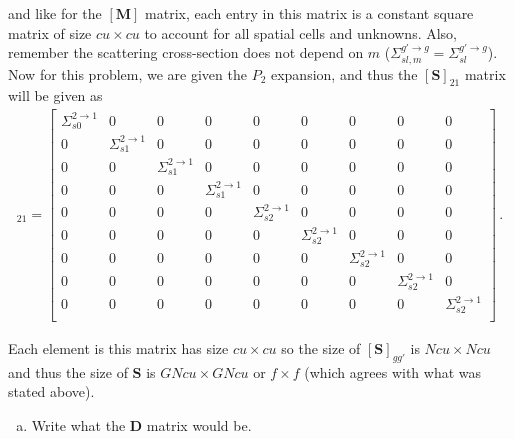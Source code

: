 \documentclass[10pt]{article}
\begin{document}
and like for the $[\textbf{M}]$ matrix, each entry in this matrix is a constant square matrix of size $cu \times cu$ to account for all spatial cells and unknowns. Also, remember the scattering cross-section does not depend on $m$ ($\Sigma_{sl,m}^{g' \rightarrow g} = \Sigma_{sl}^{g' \rightarrow g}$). Now for this problem, we are given the $P_2$ expansion, and thus the $[\textbf{S}]_{21}$ matrix will be given as
%
\begin{align*}
[\textbf{S}]_{21} = 
\begin{bmatrix}
	\Sigma_{s0}^{2\rightarrow 1}  & 0 & 0 & 0 & 0 & 0 & 0 & 0 & 0 \\
	0 & \Sigma_{s1}^{2 \rightarrow 1} & 0 & 0 & 0 & 0 & 0 & 0 & 0 \\
	0 & 0 & \Sigma_{s1}^{2 \rightarrow 1} & 0 & 0 & 0 & 0 & 0 & 0 \\
	0 & 0 & 0 & \Sigma_{s1}^{2 \rightarrow 1} & 0 & 0 & 0 & 0 & 0 \\
	0 & 0 & 0 & 0 & \Sigma_{s2}^{2 \rightarrow 1} & 0 & 0 & 0 & 0 \\
	0 & 0 & 0 & 0 & 0 & \Sigma_{s2}^{2 \rightarrow 1} & 0 & 0 & 0 \\
	0 & 0 & 0 & 0 & 0 & 0 & \Sigma_{s2}^{2 \rightarrow 1} & 0 & 0 \\
	0 & 0 & 0 & 0 & 0 & 0 & 0 & \Sigma_{s2}^{2 \rightarrow 1} & 0 \\
	0 & 0 & 0 & 0 & 0 & 0 & 0 & 0 & \Sigma_{s2}^{2 \rightarrow 1} \\
\end{bmatrix}\,.
\end{align*}

Each element is this matrix has size $cu \times cu$ so the size of $[\textbf{S}]_{gg'}$ is $Ncu \times Ncu$ and thus the size of $\textbf{S}$ is $GNcu \times GNcu$ or $f \times f$ (which agrees with what was stated above).

%
%
%

\vspace{10pt}
\begin{enumerate}[(c)]
\item Write what the $\textbf{D}$ matrix would be.
\end{enumerate}
\end{document}

